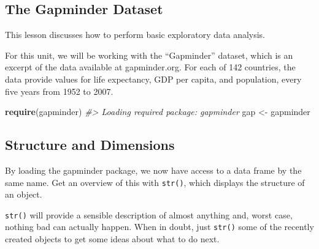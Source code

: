 \documentclass[
]{book}
\newenvironment{Shaded}{\begin{snugshade}}{\end{snugshade}}
\newcommand{\CommentTok}[1]{\textcolor[rgb]{0.56,0.35,0.01}{\textit{#1}}}
\newcommand{\KeywordTok}[1]{\textcolor[rgb]{0.13,0.29,0.53}{\textbf{#1}}}
\newcommand{\NormalTok}[1]{#1}
\newcommand{\StringTok}[1]{\textcolor[rgb]{0.31,0.60,0.02}{#1}}
\begin{document}
\hypertarget{the-gapminder-dataset}{%
\subsection{The Gapminder Dataset}\label{the-gapminder-dataset}}

This lesson discusses how to perform basic exploratory data analysis.

For this unit, we will be working with the ``Gapminder'' dataset, which is an excerpt of the data available at gapminder.org. For each of 142 countries, the data provide values for life expectancy, GDP per capita, and population, every five years from 1952 to 2007.

\begin{Shaded}
\begin{Highlighting}[]
\KeywordTok{require}\NormalTok{(gapminder)}
\CommentTok{#> Loading required package: gapminder}
\NormalTok{gap <-}\StringTok{ }\NormalTok{gapminder}
\end{Highlighting}
\end{Shaded}

\hypertarget{structure-and-dimensions}{%
\subsection{Structure and Dimensions}\label{structure-and-dimensions}}

By loading the gapminder package, we now have access to a data frame by the same name. Get an overview of this with \texttt{str()}, which displays the structure of an object.

\begin{Shaded}
\end{Shaded}

\texttt{str()} will provide a sensible description of almost anything and, worst case, nothing bad can actually happen. When in doubt, just \texttt{str()} some of the recently created objects to get some ideas about what to do next.
\end{document}
